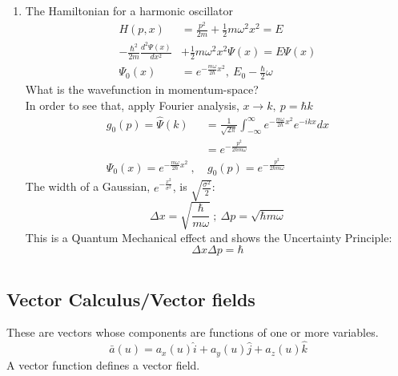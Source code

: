 \documentclass[a4paper, 11pt, normalem]{report}
\newcommand\ifnt{\int_{-\infty}^{\infty}}
\newcommand\om{\omega}
\begin{document}
\begin{enumerate}
    \item The Hamiltonian for a harmonic oscillator
            \begin{align*}
                H(p, x) &= \frac{p^2}{2m} + \frac{1}{2} m\om^2 x^2 = E \\
                -\frac{\hbar^2}{2m}\frac{d^2 \Psi(x)}{dx^2} &+ \frac{1}{2}m\om^2 x^2 \Psi(x) = E\Psi(x) \\
                \Psi_{0}(x) &= e^{-\frac{m\om}{2\hbar}x^2},~ E_0 - \frac{\hbar}{2}\om
            \end{align*}
          What is the wavefunction in momentum-space? \\
          In order to see that, apply Fourier analysis, $x \to k,~ p = \hbar k$
            \begin{align*}
                g_0(p) = \hat{\Psi}(k) &= \frac{1}{\sqrt{2\pi}} \ifnt e^{-\frac{m\om}{2\hbar}x^2}e^{-ikx}dx \\
                &= e^{-\frac{p^2}{2\hbar m\om}} \\
                \Psi_0(x) = e^{-\frac{m\om}{2\hbar}x^2} ~,&~ g_0(p) = e^{-\frac{p^2}{2\hbar m\om}}
            \end{align*}
          The width of a Gaussian, $e^{-\frac{x^2}{\sigma^2}}$, is $\sqrt{\frac{\sigma^2}{2}}$:
            \begin{equation*}
                \Delta x = \sqrt{\frac{\hbar}{m\om}} ~;~ \Delta p = \sqrt{\hbar m\om}
            \end{equation*}
          This is a Quantum Mechanical effect and shows the Uncertainty Principle:
            \begin{equation*}
                \Delta x \Delta p = \hbar
            \end{equation*}
\end{enumerate}

\chapter{}
\section{Vector Calculus/Vector fields}
These are vectors whose components are functions of one or more variables.
\begin{equation*}
    \bar{a}(u) = a_x (u)\hat{i} + a_y (u)\hat{j} + a_z (u)\hat{k}
\end{equation*}
A vector function defines a vector field.
\end{document}
